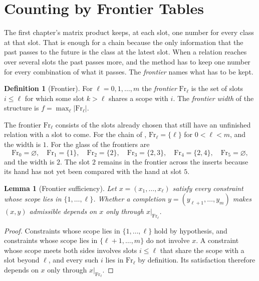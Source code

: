 \documentclass[11pt,twoside,openright]{book}
\theoremstyle{plain}
\newtheorem{lemma}[theorem]{Lemma}
\theoremstyle{definition}
\newtheorem{definition}[theorem]{Definition}
\theoremstyle{remark}
\newcommand{\Fr}{\mathrm{Fr}}
\begin{document}
\section{Counting by Frontier Tables}\label{sec:frontier}

The first chapter's matrix product keeps, at each slot, one number for every class at that slot. That is enough for a chain because the only information that the past passes to the future is the class at the latest slot. When a relation reaches over several slots the past passes more, and the method has to keep one number for every combination of what it passes. The \emph{frontier} names what has to be kept.

\begin{definition}[Frontier]\label{def:frontier}
For $\ell=0,1,\dots,m$ the \emph{frontier} $\Fr_\ell$ is the set of slots $i\le\ell$ for which some slot $k>\ell$ shares a scope with $i$. The \emph{frontier width} of the structure is $f=\max_\ell\lvert\Fr_\ell\rvert$.
\end{definition}

The frontier $\Fr_\ell$ consists of the slots already chosen that still have an unfinished relation with a slot to come. For the chain of , $\Fr_\ell=\{\ell\}$ for $0<\ell<m$, and the width is $1$. For the glass of  the frontiers are
\[
\Fr_0=\varnothing,\quad \Fr_1=\{1\},\quad \Fr_2=\{2\},\quad \Fr_3=\{2,3\},\quad \Fr_4=\{2,4\},\quad \Fr_5=\varnothing,
\]
and the width is $2$. The slot $2$ remains in the frontier across the inserts because its hand has not yet been compared with the hand at slot $5$.

\begin{lemma}[Frontier sufficiency]\label{lem:suff}
Let $x=(x_1,\dots,x_\ell)$ satisfy every constraint whose scope lies in $\{1,\dots,\ell\}$. Whether a completion $y=(y_{\ell+1},\dots,y_m)$ makes $(x,y)$ admissible depends on $x$ only through $x|_{\Fr_\ell}$.
\end{lemma}

\begin{proof}
Constraints whose scope lies in $\{1,\dots,\ell\}$ hold by hypothesis, and constraints whose scope lies in $\{\ell+1,\dots,m\}$ do not involve $x$. A constraint whose scope meets both sides involves slots $i\le\ell$ that share the scope with a slot beyond $\ell$, and every such $i$ lies in $\Fr_\ell$ by definition. Its satisfaction therefore depends on $x$ only through $x|_{\Fr_\ell}$.
\end{proof}
\end{document}
